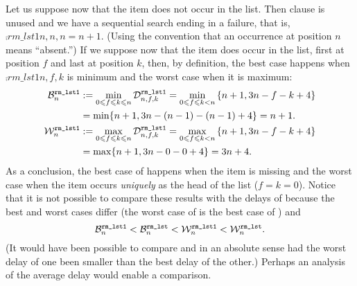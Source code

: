 Let us suppose now that the item does not occur in the list. Then
clause \clause{\beta} is unused and we have a sequential search ending
in a failure, that is, \(\comp{rm\_lst1}{n,n,n} = n + 1\). (Using the
convention that an occurrence at position \(n\) means ``absent.'') If we
suppose now that the item does occur in the list, first at position
\(f\) and last at position \(k\), then, by definition, the best case
happens when \(\comp{rm\_lst1}{n,f,k}\) is minimum and the worst case
when it is maximum:
\begin{align*}
\best{rm\_lst1}{n}
  &:= \min_{0 \leqslant f \leqslant k \leqslant  n}{\comp{rm\_lst1}{n,f,k}}
   = \min_{0 \leqslant f \leqslant k < n}{\{n+1,3n - f - k + 4\}}\\
  &= \min\{n+1,3n-(n-1)-(n-1)+4\}
   = n+1.\\
\worst{rm\_lst1}{n}
  &:= \max_{0 \leqslant f \leqslant k \leqslant  n}{\comp{rm\_lst1}{n,f,k}}
   = \max_{0 \leqslant f \leqslant k < n}{\{n+1,3n - f - k + 4\}}\\
  &= \max\{n+1,3n - 0 - 0 + 4\}
   = 3n + 4.
\end{align*}
As a conclusion, the best case of  happens when
the item is missing and the worst case when the item occurs
\emph{uniquely} as the head of the list (\(f=k=0\)). Notice that it is
not possible to compare these results with the delays of
 because the best and worst cases differ (the worst
case of  is the best case of )
and
\[
\best{rm\_lst1}{n} < \best{rm\_lst}{n} < \worst{rm\_lst1}{n} <
\worst{rm\_lst}{n}.
\]
(It would have been possible to compare  and
 in an absolute sense had the worst delay of one
been smaller than the best delay of the other.) Perhaps an analysis of
the average delay would enable a comparison.

